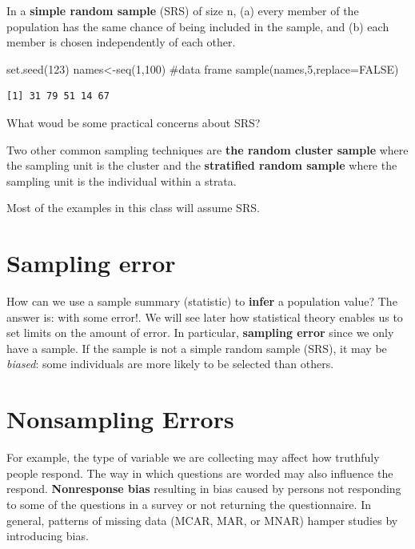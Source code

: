 \documentclass[
  letterpaper,
  DIV=11,
  numbers=noendperiod]{scrreprt}
\newenvironment{Shaded}{\begin{snugshade}}{\end{snugshade}}
\newcommand{\AttributeTok}[1]{\textcolor[rgb]{0.40,0.45,0.13}{#1}}
\newcommand{\CommentTok}[1]{\textcolor[rgb]{0.37,0.37,0.37}{#1}}
\newcommand{\ConstantTok}[1]{\textcolor[rgb]{0.56,0.35,0.01}{#1}}
\newcommand{\DecValTok}[1]{\textcolor[rgb]{0.68,0.00,0.00}{#1}}
\newcommand{\FunctionTok}[1]{\textcolor[rgb]{0.28,0.35,0.67}{#1}}
\newcommand{\NormalTok}[1]{\textcolor[rgb]{0.00,0.23,0.31}{#1}}
\newcommand{\OtherTok}[1]{\textcolor[rgb]{0.00,0.23,0.31}{#1}}
\begin{document}
In a \textbf{simple random sample} (SRS) of size n, (a) every member of
the population has the same chance of being included in the sample, and
(b) each member is chosen independently of each other.

\begin{Shaded}
\begin{Highlighting}[]
\FunctionTok{set.seed}\NormalTok{(}\DecValTok{123}\NormalTok{)}
\NormalTok{names}\OtherTok{\textless{}{-}}\FunctionTok{seq}\NormalTok{(}\DecValTok{1}\NormalTok{,}\DecValTok{100}\NormalTok{) }\CommentTok{\#data frame}
\FunctionTok{sample}\NormalTok{(names,}\DecValTok{5}\NormalTok{,}\AttributeTok{replace=}\ConstantTok{FALSE}\NormalTok{)}
\end{Highlighting}
\end{Shaded}

\begin{verbatim}
[1] 31 79 51 14 67
\end{verbatim}

What woud be some practical concerns about SRS?

Two other common sampling techniques are \textbf{the random cluster
sample} where the sampling unit is the cluster and the
\textbf{stratified random sample} where the sampling unit is the
individual within a strata.

Most of the examples in this class will assume SRS.

\section{Sampling error}\label{sampling-error}

How can we use a sample summary (statistic) to \textbf{infer} a
population value? The answer is: with some error!. We will see later how
statistical theory enables us to set limits on the amount of error. In
particular, \textbf{sampling error} since we only have a sample. If the
sample is not a simple random sample (SRS), it may be \emph{biased}:
some individuals are more likely to be selected than others.

\section{Nonsampling Errors}\label{nonsampling-errors}

For example, the type of variable we are collecting may affect how
truthfuly people respond. The way in which questions are worded may also
influence the respond. \textbf{Nonresponse bias} resulting in bias
caused by persons not responding to some of the questions in a survey or
not returning the questionnaire. In general, patterns of missing data
(MCAR, MAR, or MNAR) hamper studies by introducing bias.
\end{document}
